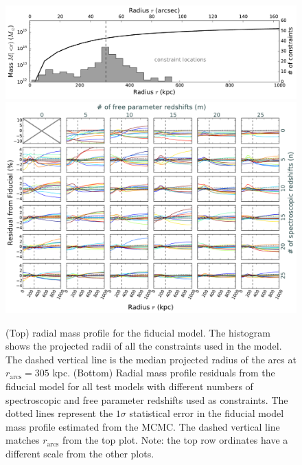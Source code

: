 \begin{figure}
\center
\includegraphics[width=\textwidth]{Chap3/c3f5a.pdf}
\includegraphics[width=\textwidth]{Chap3/c3f5b.pdf}
\caption[Radial mass profile of Ares fiducial lens model and of test models]{(Top) radial mass profile for the fiducial model. The histogram shows the projected radii of all the constraints used in the model. The dashed vertical line is the median projected radius of the arcs at $r_\mathrm{arcs}=305$ kpc. (Bottom) Radial mass profile residuals from the fiducial model for all test models with different numbers of spectroscopic and free parameter redshifts used as constraints. The dotted lines represent the $1\sigma$ statistical error in the fiducial model mass profile estimated from the MCMC. The dashed vertical line matches $r_\mathrm{arcs}$ from the top plot. Note: the top row ordinates have a different scale from the other plots.}
\label{chap3:fig:mass}
\end{figure}

